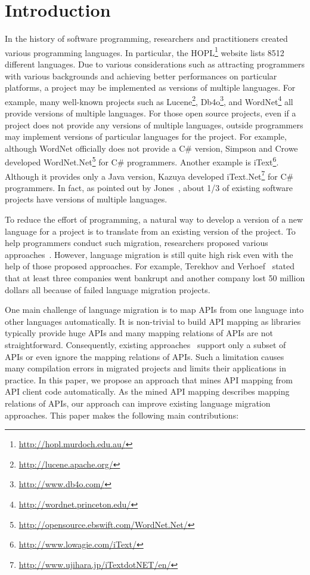 \section{Introduction}
\label{sec:introduction} In the history of software programming,
researchers and practitioners created various programming languages.
In particular, the HOPL\footnote{\url{http://hopl.murdoch.edu.au/}}
website lists 8512 different languages. Due to various
considerations such as attracting programmers with various
backgrounds and achieving better performances on particular
platforms, a project may be implemented as versions of multiple
languages. For example, many well-known projects such as
Lucene\footnote{\url{http://lucene.apache.org/}},
Db4o\footnote{\url{http://www.db4o.com/}}, and
WordNet\footnote{\url{http://wordnet.princeton.edu/}} all provide
versions of multiple languages. For those open source projects, even
if a project does not provide any versions of multiple languages,
outside programmers may implement versions of particular languages
for the project. For example, although WordNet officially does not
provide a C\# version, Simpson and Crowe developed
WordNet.Net\footnote{\url{http://opensource.ebswift.com/WordNet.Net/}}
for C\# programmers. Another example is
iText\footnote{\url{http://www.lowagie.com/iText/}}. Although it
provides only a Java version, Kazuya developed
iText.Net\footnote{\url{http://www.ujihara.jp/iTextdotNET/en/}} for
C\# programmers. In fact, as pointed out by
Jones~\cite{jones1998estimating}, about 1/3 of existing software
projects have versions of multiple languages.

To reduce the effort of programming, a natural way to develop a
version of a new language for a project is to translate from an
existing version of the project. To help programmers conduct such
migration, researchers proposed various
approaches~\cite{mossienko2003automated,yasumatsu1995spice,hainaut2008migration}.
However, language migration is still quite high risk even with the
help of those proposed approaches. For example, Terekhov and
Verhoef~\cite{terekhov2000realities} stated that at least three
companies went bankrupt and another company lost 50 million dollars
all because of failed language migration projects.

One main challenge of language migration is to map APIs from one
language into other languages automatically. It is non-trivial to
build API mapping as libraries typically provide huge APIs and many
mapping relations of APIs are not straightforward. Consequently,
existing
approaches~\cite{mossienko2003automated,yasumatsu1995spice,hainaut2008migration}
support only a subset of APIs or even ignore the mapping relations
of APIs. Such a limitation causes many compilation errors in
migrated projects and limits their applications in practice. In this
paper, we propose an approach that mines API mapping from API client
code automatically. As the mined API mapping describes mapping
relations of APIs, our approach can improve existing language
migration approaches. This paper makes the following main
contributions:

